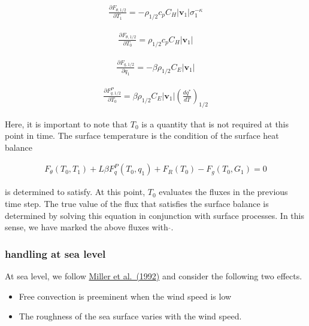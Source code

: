 \begin{eqnarray}
\frac{\partial{F_{\theta,1/2}}}{\partial {T_1}}
= - \rho_{1/2} c_p C_H |{\mathbf{v}}_1| \sigma_1^{-\kappa}
\end{eqnarray}

\begin{eqnarray}
\frac{\partial{F_{\theta,1/2}}}{\partial {T_0}}
= \rho_{1/2} c_p C_H |{\mathbf{v}}_1|
\end{eqnarray}

\begin{eqnarray}
\frac{\partial{F_{q,1/2}}}{\partial {q_1}}
 =  - \beta \rho_{1/2} C_E |{\mathbf{v}}_1|
\end{eqnarray}

\begin{eqnarray}
\frac{\partial{F_{q,1/2}^P}}{\partial {T_0}}
 =  \beta \rho_{1/2} C_E |{\mathbf{v}}_1| \left( \frac{d {q^*}}{d {T}} \right)_{1/2}
\end{eqnarray}

Here, it is important to note that \(T_0\) is a quantity that is not
required at this point in time. The surface temperature is the condition
of the surface heat balance

\begin{eqnarray}
   F_\theta(T_0,T_1) + L \beta F_q^P(T_0,q_1) + F_R(T_0) - F_g(T_0,G_1) = 0
\end{eqnarray}

is determined to satisfy. At this point, \(T_0\) evaluates the fluxes in
the previous time step. The true value of the flux that satisfies the
surface balance is determined by solving this equation in conjunction
with surface processes. In this sense, we have marked the above fluxes
with \(\hat{{}}\).

\hypertarget{handling-at-sea-level}{%
\subsubsection{handling at sea level}\label{handling-at-sea-level}}

At sea level, we follow
\href{papers/Millers1992_Measuring_dynamic_surface\%20and_interfacial_tensions.pdf}{Miller
et al.~(1992)} and consider the following two effects.

\begin{itemize}
\item
  Free convection is preeminent when the wind speed is low
\item
  The roughness of the sea surface varies with the wind speed.
\end{itemize}


